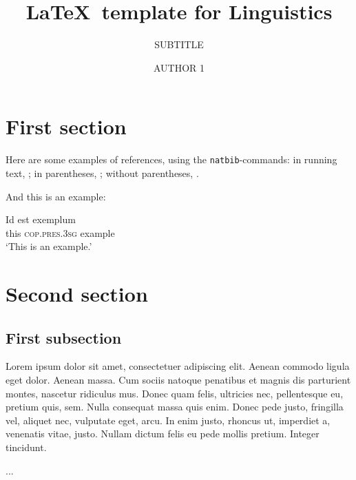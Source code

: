 \documentclass[english]{article}
\begin{document}

   \author*[1]{AUTHOR 1}
  \title{\LaTeX\ template for Linguistics}
  \subtitle{SUBTITLE}
  \aop

\maketitle  

\section{First section} 

Here are some examples of references, using the \verb+natbib+-commands:
in running text, \citet[123]{Dowty:1979};
in parentheses, \citep{Grimm:2012, R};
without parentheses, \citealt{oldlme4, lme4}.

And this is an example:

\begin{exe}
  \ex\label{example}
  \gll Id est exemplum\\
       this \textsc{cop.pres.3sg} example\\
       `This is an example.'\\
       \citep[112]{Partee:1995}
\end{exe}
%

\section{Second section} 

\subsection{First subsection} 

Lorem ipsum dolor sit amet, consectetuer adipiscing elit. Aenean
commodo ligula eget dolor. Aenean massa. Cum sociis natoque penatibus
et magnis dis parturient montes, nascetur ridiculus mus. Donec quam
felis, ultricies nec, pellentesque eu, pretium quis, sem. Nulla
consequat massa quis enim. Donec pede justo, fringilla vel, aliquet
nec, vulputate eget, arcu. In enim justo, rhoncus ut, imperdiet a,
venenatis vitae, justo. Nullam dictum felis eu pede mollis
pretium. Integer tincidunt.

\begin{acknowledgement}
  ...
\end{acknowledgement}

\printbibliography
\end{document}
